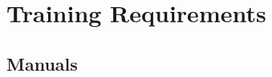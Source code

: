 \KNEADSECTIONNEWPAGE
\section{Training Requirements}
\label{lab:sec_Training}
% 

\KNEADSUBSECTIONNEWPAGE
\subsection{Manuals}
\label{lab:sec_TrainingManuals}





% 



% 